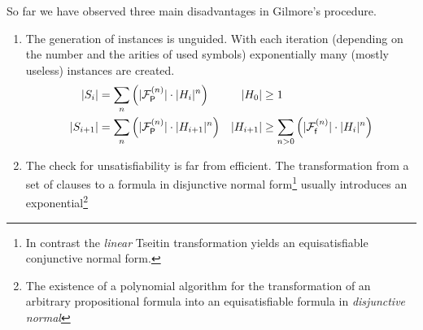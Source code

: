 So far we have observed three main disadvantages in Gilmore's procedure.
\begin{enumerate}
	\item\label{enum:gilmore:generation}
	The generation of instances is unguided.
	With each iteration 
	(depending on the number and the arities of used symbols) exponentially many (mostly useless)
	instances are created.
	\begin{align*}
	\lvert S_{i} \rvert &= \sum_n \left( \lvert {\mathcal{F}^{(n)}_{\mathsf{P}}} \rvert\cdot \lvert H_{i}\rvert^n \right)
	&
	\lvert H_0 \rvert &\geq 1
	\\
	\lvert S_{i+1} \rvert &= \sum_n \left( \lvert {\mathcal{F}^{(n)}_{\mathsf{P}}} \rvert\cdot \lvert H_{i+1}\rvert^n \right)
	&
	\lvert H_{i+1}\rvert &\geq
	\sum_{n>0}\left(
	\lvert{\mathcal{F}^{(n)}_{\mathsf{f}}}\rvert\cdot\lvert H_i \rvert^n
	\right)
	\end{align*}
	\item\label{enum:gilmore:transformation}
	The check for unsatisfiability is far from efficient.
	The transformation from a set of clauses
	to a formula in disjunctive normal form\footnote{
		In contrast the \emph{linear} Tseitin transformation yields an equisatisfiable conjunctive normal form.
	}
	usually introduces an exponential\footnote{
		The existence of a polynomial algorithm
		for the transformation of
		an arbitrary propositional formula into
		an equisatisfiable formula in \emph{disjunctive normal
}}
\end{enumerate}
